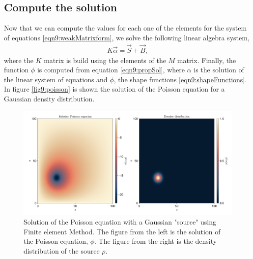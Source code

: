\documentclass[main.tex]{subfiles}
\begin{document}
\subsection{Compute the solution}

Now that we can compute the values for each one of the elements for the system of equations \eqref{eqn9:weakMatrixform}, we solve the following linear algebra system,
\begin{gather*}
    K\vec{\alpha} = \vec{S}+\vec{B},
\end{gather*}
where the $K$ matrix is build using the elements of the $M$ matrix.
Finally, the function $\phi$ is computed from equation \eqref{eqn9:propSol}, where $\alpha$ is the solution of the linear system of equations and $\phi$, the shape functions \eqref{eqn9:shapeFunctions}.
In figure \eqref{fig9:poisson} is shown the solution of the Poisson equation for a Gaussian density distribution.


\newpage

\begin{figure}[ht!]
    \centering
    \includegraphics[width=\textwidth]{imgs/hw9/poissonHeatmap.png}
    \caption{Solution of the Poisson equation with a Gaussian "source" using Finite element Method. 
    The figure from the left is the solution of the Poisson equation, $\phi$.
    The figure from the right is the density distribution of the source $\rho$.
    }
    \label{fig9:poisson}
\end{figure}



\end{document}
